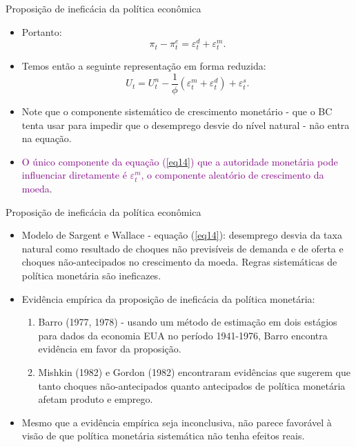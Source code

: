 \documentclass[10pt]{beamer}
\begin{document}
\begin{frame}{Proposição de ineficácia da política econômica}
    \begin{itemize}
        \item Portanto:
        \[
        \pi_t - \pi_t^e = \varepsilon_t^d + \varepsilon_t^m.
        \]
        \bigskip
        \item Temos então a seguinte representação em forma reduzida:
        \begin{equation}
            U_t = U_t^n - \frac{1}{\phi}(\varepsilon_t^m + \varepsilon_t^d) + \varepsilon_t^s.
            \label{eq14}
        \end{equation}
        \bigskip
        \item Note que o componente sistemático de crescimento monetário - que o BC tenta usar para impedir que o desemprego desvie do nível natural - não entra na equação.
        \bigskip
        \item \textcolor{purple}{O único componente da equação (\ref{eq14}) que a autoridade monetária pode influenciar diretamente é $\varepsilon_t^m$, o componente aleatório de crescimento da moeda}.
    \end{itemize}
\end{frame}

\begin{frame}{Proposição de ineficácia da política econômica}
    \begin{itemize}
        \item Modelo de Sargent e Wallace - equação (\ref{eq14}): desemprego desvia da taxa natural como resultado de choques não previsíveis de demanda e de oferta e choques não-antecipados no crescimento da moeda. Regras sistemáticas de política monetária são ineficazes.
        \bigskip
        \item Evidência empírica da proposição de ineficácia da política monetária:
        \bigskip
        \begin{enumerate}
            \item Barro (1977, 1978) - usando um método de estimação em dois estágios para dados da economia EUA no período 1941-1976, Barro encontra evidência em favor da proposição.
            \bigskip
            \item Mishkin (1982) e Gordon (1982) encontraram evidências que sugerem que tanto choques não-antecipados quanto antecipados de política monetária afetam produto e emprego.
        \end{enumerate}
        \bigskip
        \item Mesmo que a evidência empírica seja inconclusiva, não parece favorável à visão de que política monetária sistemática não tenha efeitos reais.
    \end{itemize}
\end{frame}
\end{document}
